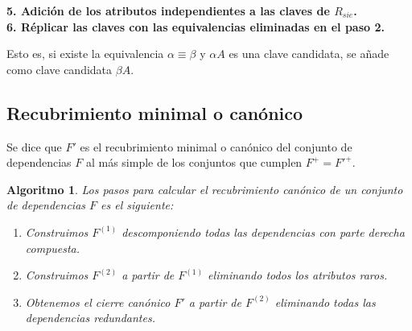 \documentclass[12pt,a4paper]{article}
\theoremstyle{ejemplo}
\theoremstyle{algoritmo}
\newtheorem*{alg}{Algoritmo} %
\begin{document}
\textbf{5. Adición de los atributos independientes a las claves de $R_{sie}$.}
\\

\textbf{6. Réplicar las claves con las equivalencias eliminadas en el paso 2.}

Esto es, si existe la equivalencia $\alpha\equiv\beta$ y $\alpha A$ es una clave
candidata, se añade como clave candidata $\beta A$.

\subsection*{Recubrimiento minimal o canónico}
Se dice que $F'$ es el recubrimiento minimal o canónico del conjunto de
dependencias $F$ al más simple de los conjuntos que cumplen $F^+={F'}^+$.

\begin{alg}
Los pasos para calcular el recubrimiento canónico de un conjunto de dependencias
$F$ es el siguiente:
\begin{enumerate}[noitemsep]
	\item Construimos $F^{(1)}$ descomponiendo todas las dependencias con parte
	derecha compuesta.
	\item Construimos $F^{(2)}$ a partir de $F^{(1)}$ eliminando todos los
	atributos raros.
	\item Obtenemos el cierre canónico $F'$ a partir de $F^{(2)}$ eliminando
	todas las dependencias redundantes.
\end{enumerate}
\end{alg}
\end{document}
